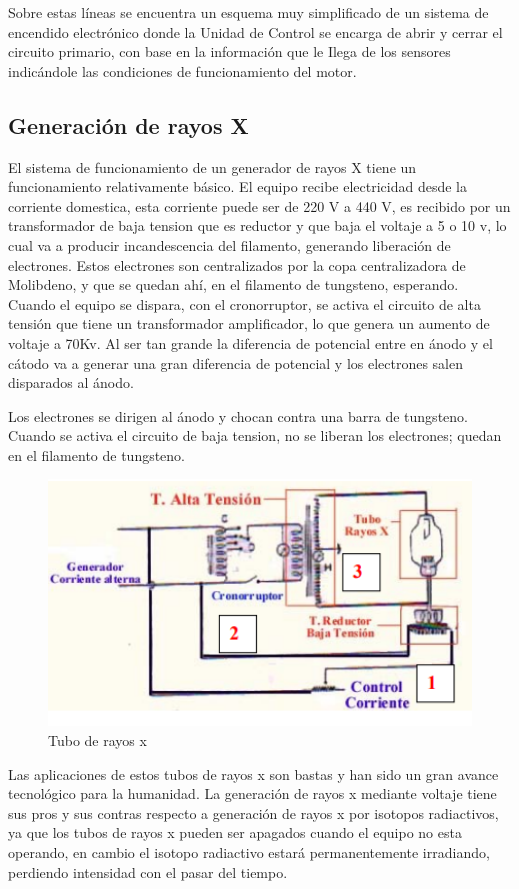 Sobre estas líneas se encuentra un esquema muy simplificado de
un sistema de encendido electrónico donde la Unidad de Control se
encarga de abrir y cerrar el circuito primario, con base en la información
que le Ilega de los sensores indicándole las condiciones de
funcionamiento del motor. \cite{ignicion}

\subsection{Generación de rayos X}

El sistema de funcionamiento de un generador de rayos X tiene un funcionamiento relativamente básico.  El equipo recibe electricidad desde la corriente domestica, esta corriente puede ser de 220 V a 440 V, es recibido por un transformador de baja tension que es reductor y que baja el voltaje a 5 o 10 v, lo cual va a producir incandescencia del filamento, generando liberación de electrones. Estos electrones son centralizados por la copa centralizadora de Molibdeno, y que se quedan ahí, en el filamento de tungsteno, esperando. \\

Cuando el equipo se dispara, con el cronorruptor, se activa el circuito de alta tensión que tiene un transformador amplificador, lo que genera un aumento de voltaje a 70Kv. Al ser tan grande la diferencia de potencial entre en ánodo y el cátodo va a generar una gran diferencia de potencial y los electrones salen disparados al ánodo. 

Los electrones se dirigen al ánodo y chocan contra una barra de tungsteno. Cuando se activa el circuito de baja tension, no se liberan los electrones; quedan en el filamento de tungsteno.\\

\begin{figure}[H]
\centering
\includegraphics[width=12cm]{capitulo3/figs/rayos.png}
\caption{ Tubo de rayos x}
\end{figure}

Las aplicaciones de estos tubos de rayos x son bastas y han sido un gran avance tecnológico para la humanidad. La generación de rayos x mediante voltaje tiene sus pros y sus contras respecto a generación de rayos x por isotopos radiactivos, ya que los tubos de rayos x pueden ser apagados cuando el equipo no esta operando, en cambio el isotopo radiactivo estará permanentemente irradiando, perdiendo intensidad con el pasar del tiempo.  \\

